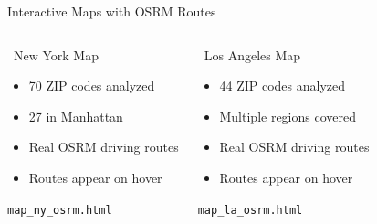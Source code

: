 \documentclass[aspectratio=169,9pt]{beamer}
\begin{document}
\begin{frame}{Interactive Maps with OSRM Routes}
\begin{columns}
\begin{block}{\faMap\ New York Map}
\begin{itemize}
    \item 70 ZIP codes analyzed
    \item 27 in Manhattan
    \item Real OSRM driving routes
    \item Routes appear on hover
\end{itemize}
\vspace{0.5em}
\footnotesize{\texttt{map\_ny\_osrm.html}}
\end{block}

\begin{block}{\faMap\ Los Angeles Map}
\begin{itemize}
    \item 44 ZIP codes analyzed
    \item Multiple regions covered
    \item Real OSRM driving routes
    \item Routes appear on hover
\end{itemize}
\vspace{0.5em}
\footnotesize{\texttt{map\_la\_osrm.html}}
\end{block}
\end{columns}

\vspace{0.8em}
\begin{center}
\end{center}
\end{frame}
\end{document}
